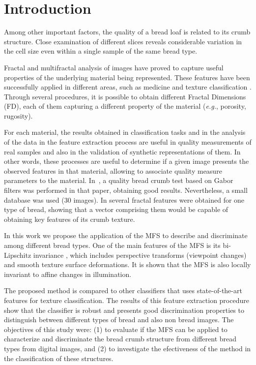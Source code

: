 \section{Introduction}
\label{intro}
Among other important factors, the quality of a bread loaf is related to its crumb structure. Close examination of different slices reveals considerable variation in the cell size even within a single sample of the same bread type. 

Fractal and multifractal analysis of images have proved to capture useful properties of the underlying material being represented. These features have been successfully applied in different areas, such as medicine \cite{Andjelkovic2008,Yu2011} and texture classification \cite{Wendt2009}. Through several procedures, it is possible to obtain different Fractal Dimensions (FD), each of them capturing a different property of the material ({\em e.g.}, porosity, rugosity).

For each material, the results obtained in classification tasks and in the analysis of the data in the feature extraction process are useful in quality measurements of real samples and also in the validation of synthetic representations of them. In other words, these processes are useful to determine if a given image presents the observed features in that material, allowing to associate quality measure parameters to the material. In~\cite{Fan2006}, a quality bread crumb test based on Gabor filters was performed in that paper, obtaining good results. Nevertheless, a small database was used ($30$ images). In \cite{Gonzales2008} several fractal features were obtained for one type of bread, showing that a vector comprising them would be capable of obtaining key features of its crumb texture.

In this work we propose the application of the MFS \cite{Xu2006} to describe and discriminate among different bread types. One of the main features of the MFS is its bi-Lipschitz invariance \cite{bilipXXX}, which includes perspective transforms (viewpoint changes) and smooth texture surface deformations. It is shown that the MFS is also locally invariant to affine changes in illumination.

The proposed method is compared to other classifiers that uses state-of-the-art features for texture classification. The results of this feature extraction procedure show that the classifier is robust and presents good discrimination properties to distinguish between different types of bread and also non bread images. The objectives of this study were: (1) to evaluate if the MFS can be applied to characterize and discriminate the bread crumb structure from different bread types from digital images, and (2) to investigate the efectiveness of the method in the classification of these structures.

